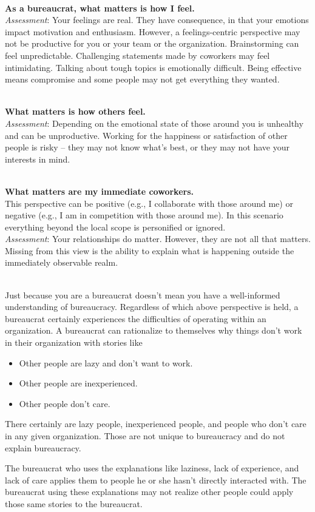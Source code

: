 \ \\
\textbf{As a bureaucrat, what matters is how I feel.} \\
\textit{Assessment}: Your feelings are real. They have consequence, in that your emotions impact motivation and enthusiasm. However, a feelings-centric perspective may not be productive for you or your team or the organization. Brainstorming can feel unpredictable. Challenging statements made by coworkers may feel intimidating. Talking about tough topics is emotionally difficult. 
Being effective means compromise and some people may not get everything they wanted. %

\ \\ 
\textbf{What matters is how others feel.}\\
\textit{Assessment}: Depending on the emotional state of those around you is unhealthy and can be unproductive. Working for the happiness or satisfaction of other people is risky -- they may not know what's best, or they may not have your interests in mind.

\ \\
\textbf{What matters are my immediate coworkers.}\\
This perspective can be positive (e.g., I collaborate with those around me) or negative (e.g., I am in competition with those around me).
In this scenario everything beyond the local scope is personified or ignored.  \\
\textit{Assessment}: Your relationships do matter. However, they are not all that matters. Missing from this view is the ability to explain what is happening outside the immediately observable realm. 

\ \\

Just because you are a bureaucrat doesn't mean you have a well-informed understanding of bureaucracy. Regardless of which above perspective is held, a bureaucrat certainly experiences the difficulties of operating within an organization. A bureaucrat can rationalize to themselves why things don't work in their organization with stories like
\begin{itemize}
\item Other people are lazy and don't want to work.
\item Other people are inexperienced.
\item Other people don't care.
\end{itemize}
There certainly are lazy people, inexperienced people, and people who don't care in any given organization. Those are not unique to bureaucracy and do not explain bureaucracy.

The bureaucrat who uses the explanations like laziness, lack of experience, and lack of care applies them to people he or she hasn't directly interacted with.  The bureaucrat using these explanations may not realize other people could apply those same stories to the bureaucrat. 